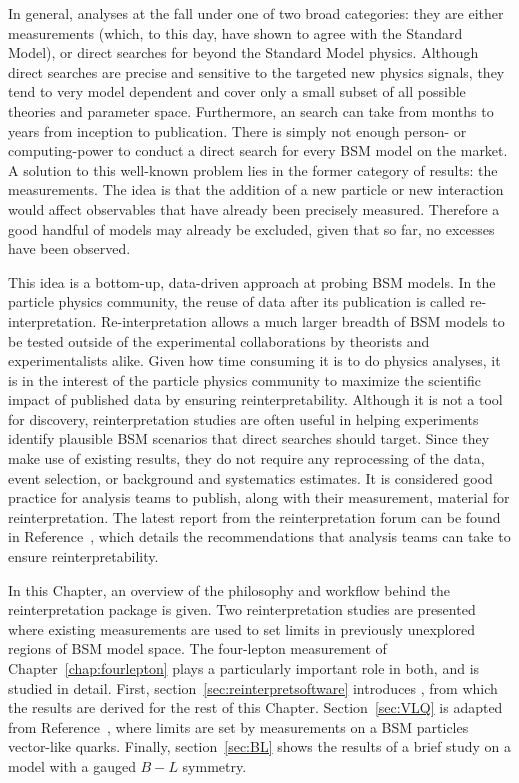 In general, analyses at the \LHC fall under one of two broad categories: they are either measurements (which, to this day, have shown to agree with the Standard Model), or direct searches for beyond the Standard Model physics. Although direct searches are precise and sensitive to the targeted new physics signals, they tend to very model dependent and cover only a small subset of all possible theories and parameter space. Furthermore, an \LHC search can take from months to years from inception to publication. There is simply not enough person- or computing-power to conduct a direct search for every BSM model on the market. A solution to this well-known problem lies in the former category of \LHC results: the measurements. The idea is that the addition of a new particle or new interaction would affect observables that have already been precisely measured. Therefore a good handful of models may already be excluded, given that so far, no excesses have been observed. 

This idea is a bottom-up, data-driven approach at probing BSM models. In the particle physics community, the reuse of data after its publication is called re-interpretation. Re-interpretation allows a much larger breadth of BSM models to be tested outside of the experimental collaborations by theorists and experimentalists alike. Given how time consuming it is to do physics analyses, it is in the interest of the particle physics community to maximize the scientific impact of published data by ensuring reinterpretability. Although it is not a tool for discovery, reinterpretation studies are often useful in helping experiments identify plausible BSM scenarios that direct searches should target. Since they make use of existing results, they do not require any reprocessing of the data, event selection, or background and systematics estimates. It is considered good practice for analysis teams to publish, along with their measurement, material for reinterpretation. The latest report from the \LHC reinterpretation forum can be found in Reference~\cite{reinterpretation_forum}, which details the recommendations that analysis teams can take to ensure reinterpretability.

In this Chapter, an overview of the philosophy and workflow behind the \contur reinterpretation package is given. Two reinterpretation studies are presented where existing \LHC measurements are used to set limits in previously unexplored regions of BSM model space. The \ATLAS four-lepton measurement of Chapter~\ref{chap:fourlepton} plays a particularly important role in both, and is studied in detail. First, section~\ref{sec:reinterpretsoftware} introduces \contur, from which the results are derived for the rest of this Chapter. Section~\ref{sec:VLQ} is adapted from Reference~\cite{VLQ_contur}, where limits are set by \LHC measurements on a BSM particles vector-like quarks. Finally, section~\ref{sec:BL} shows the results of a brief study on a model with a gauged $B-L$ symmetry.

